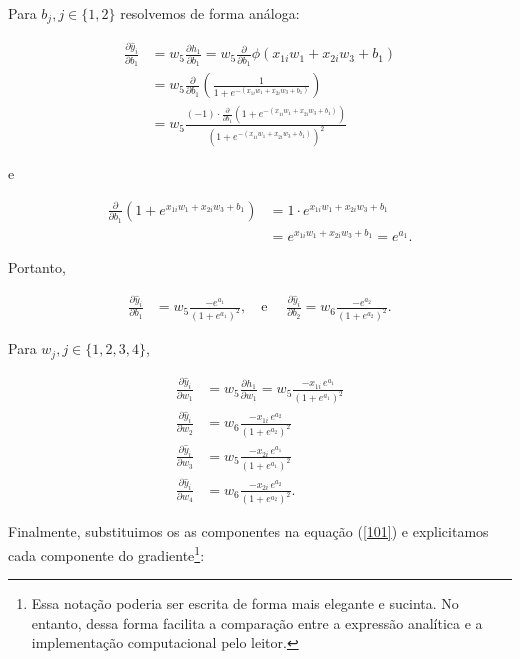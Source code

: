 \documentclass[
  a4paperpaper,
]{article}
\begin{document}
Para \(b_j, j \in \{1, 2\}\) resolvemos de forma análoga:

\begin{align*}
\frac{\partial \hat{y}_i}{\partial b_1} &= w_5 \frac{\partial h_1}{\partial b_1} = w_5 \frac{\partial}{\partial b_1} \phi(x_{1i} w_1 + x_{2i} w_3 + b_1) \\  
&= w_5 \frac{\partial}{\partial b_1} \left( \frac{1}{1+ e^{-(x_{1i} w_1 + x_{2i} w_3 + b_1)}} \right) \\  
&= w_5 \frac{(-1) \cdot \frac{\partial}{\partial b_1} \left(1+ e^{-(x_{1i} w_1 + x_{2i} w_3 + b_1)} \right)}{\left(1+ e^{-(x_{1i} w_1 + x_{2i} w_3 + b_1)} \right)^2}
\end{align*}

e

\begin{align*}
\frac{\partial}{\partial b_1} \left(1+ e^{x_{1i} w_1 + x_{2i} w_3 + b_1} \right) &= 1 \cdot e^{x_{1i} w_1 + x_{2i} w_3 + b_1} \\
&= e^{x_{1i} w_1 + x_{2i} w_3 + b_1} = e^{a_1}.
\end{align*}

Portanto,

\begin{align*}
  \frac{\partial \hat{y}_i}{\partial b_1} &= w_5 \frac{-e^{a_1}}{\left( 1+e^{a_1} \right)^2 }, \quad \text{e } \quad \frac{\partial \hat{y}_i}{\partial b_2} = w_6 \frac{-e^{a_2}}{\left( 1+e^{a_2} \right)^2 }.
\end{align*}

Para \(w_j, j \in \{ 1, 2, 3, 4 \}\),

\begin{align*}
  \frac{\partial \hat{y}_i}{\partial w_1} &= w_5 \frac{\partial h_1}{\partial w_1} = w_5 \frac{-x_{1i} \, e^{a_1}}{\left(1 + e^{a_1}\right)^2} \\
  \frac{\partial \hat{y}_i}{\partial w_2} &= w_6 \frac{-x_{1i} \, e^{a_2}}{\left(1 + e^{a_2}\right)^2} \\
  \frac{\partial \hat{y}_i}{\partial w_3} &= w_5 \frac{-x_{2i} \, e^{a_1}}{\left(1 + e^{a_1}\right)^2} \\
  \frac{\partial \hat{y}_i}{\partial w_4} &= w_6 \frac{-x_{2i} \, e^{a_2}}{\left(1 + e^{a_2}\right)^2}.
\end{align*}

Finalmente, substituimos os as componentes na equação (\ref{101}) e
explicitamos cada componente do gradiente\footnote{Essa notação poderia
  ser escrita de forma mais elegante e sucinta. No entanto, dessa forma
  facilita a comparação entre a expressão analítica e a implementação
  computacional pelo leitor.}:
\end{document}

